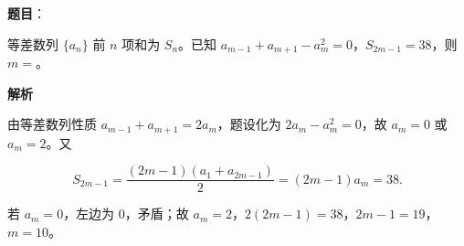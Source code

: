 \begin{answer}

\textbf{题目}：

等差数列 $\{a_n\}$ 前 $n$ 项和为 $S_n$。已知 $a_{m-1}+a_{m+1}-a_m^2=0$，$S_{2m-1}=38$，则 $m=$\gkblank{}。

\textbf{解析}

由等差数列性质 $a_{m-1}+a_{m+1}=2a_m$，题设化为 $2a_m-a_m^2=0$，故 $a_m=0$ 或 $a_m=2$。又

\nopagebreak[4]
\[S_{2m-1}=\frac{(2m-1)(a_1+a_{2m-1})}{2}=(2m-1)a_m=38 .\]

若 $a_m=0$，左边为 $0$，矛盾；故 $a_m=2$，$2(2m-1)=38$，$2m-1=19$，$m=10$。


\end{answer}

